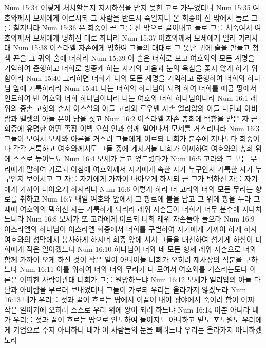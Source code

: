 Num 15:34  어떻게 처치할는지 지시하심을 받지 못한 고로 가두었더니
Num 15:35  여호와께서 모세에게 이르시되 그 사람을 반드시 죽일지니 온 회중이 진 밖에서 돌로 그를 칠지니라
Num 15:36  온 회중이 곧 그를 진 밖으로 끌어내고 돌로 그를 쳐죽여서 여호와께서 모세에게 명하신 대로 하니라
Num 15:37  여호와께서 모세에게 일러 가라사대
Num 15:38  이스라엘 자손에게 명하여 그들의 대대로 그 옷단 귀에 술을 만들고 청색 끈을 그 귀의 술에 더하라
Num 15:39  이 술은 너희로 보고 여호와의 모든 계명을 기억하여 준행하고 너희로 방종케 하는 자기의 마음과 눈의 욕심을 좇지 않게 하기 위함이라
Num 15:40  그리하면 너희가 나의 모든 계명을 기억하고 준행하여 너희의 하나님 앞에 거룩하리라
Num 15:41  나는 너희의 하나님이 되려 하여 너희를 애굽 땅에서 인도하여 낸 여호와 너희 하나님이니라 나는 여호와 너희 하나님이니라
Num 16:1  레위의 증손 고핫의 손자 이스할의 아들 고라와 르우벤 자손 엘리압의 아들 다단과 아비람과 벨렛의 아들 온이 당을 짓고
Num 16:2  이스라엘 자손 총회에 택함을 받은 자 곧 회중에 유명한 어떤 족장 이백 오십 인과 함께 일어나서 모세를 거스리니라
Num 16:3  그들이 모여서 모세와 아론을 거스려 그들에게 이르되 너희가 분수에 지나도다 회중이 다 각각 거룩하고 여호와께서도 그들 중에 계시거늘 너희가 어찌하여 여호와의 총회 위에 스스로 높이느뇨
Num 16:4  모세가 듣고 엎드렸다가
Num 16:5  고라와 그 모든 무리에게 말하여 가로되 아침에 여호와께서 자기에게 속한 자가 누구인지 거룩한 자가 누구인지 보이시고 그 자를 자기에게 가까이 나아오게 하시되 곧 그가 택하신 자를 자기에게 가까이 나아오게 하시리니
Num 16:6  이렇게 하라 너 고라와 너의 모든 무리는 향로를 취하고
Num 16:7  내일 여호와 앞에서 그 향로에 불을 담고 그 위에 향을 두라 그 때에 여호와의 택하신 자는 거룩하게 되리라 레위 자손들아 너희가 너무 분수에 지나치느니라
Num 16:8  모세가 또 고라에게 이르되 너희 레위 자손들아 들으라
Num 16:9  이스라엘의 하나님이 이스라엘 회중에서 너희를 구별하여 자기에게 가까이 하게 하사 여호와의 성막에서 봉사하게 하시며 회중 앞에 서서 그들을 대신하여 섬기게 하심이 너희에게 작은 일이겠느냐
Num 16:10  하나님이 너와 네 모든 형제 레위 자손으로 너와 함께 가까이 오게 하신 것이 작은 일이 아니어늘 너희가 오히려 제사장의 직분을 구하느냐
Num 16:11  이를 위하여 너와 너의 무리가 다 모여서 여호와를 거스리는도다 아론은 어떠한 사람이관대 너희가 그를 원망하느냐
Num 16:12  모세가 엘리압의 아들 다단과 아비람을 부르러 보내었더니 그들이 가로되 우리는 올라가지 않겠노라
Num 16:13  네가 우리를 젖과 꿀이 흐르는 땅에서 이끌어 내어 광야에서 죽이려 함이 어찌 작은 일이기에 오히려 스스로 우리 위에 왕이 되려 하느냐
Num 16:14  이뿐 아니라 네가 우리를 젖과 꿀이 흐르는 땅으로 인도하여 들이지도 아니하고 밭도 포도원도 우리에게 기업으로 주지 아니하니 네가 이 사람들의 눈을 빼려느냐 우리는 올라가지 아니하겠노라
